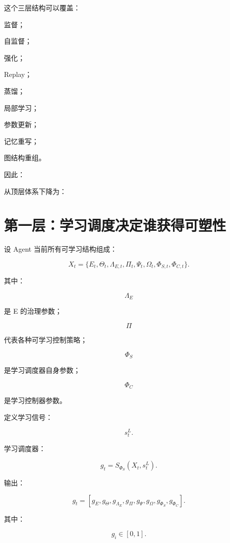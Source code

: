 这个三层结构可以覆盖：

监督；

自监督；

强化；

Replay；

蒸馏；

局部学习；

参数更新；

记忆重写；

图结构重组。

因此：

\begin{statementbox}
\centering
{}
\end{statementbox}

从顶层体系下降为：

\begin{statementbox}
\centering
{}
\end{statementbox}


\section{第一层：学习调度决定谁获得可塑性}

设 Agent 当前所有可学习结构组成：

\[
\boxed{
X_t
=
\{
E_t,
\Theta_t,
\Lambda_{E,t},
\Pi_t,
\Psi_t,
\Omega_t,
\Phi_{S,t},
\Phi_{C,t}
\}.
}
\]

其中：

\[
\Lambda_E
\]

是 E 的治理参数；

\[
\Pi
\]

代表各种可学习控制策略；

\[
\Phi_S
\]

是学习调度器自身参数；

\[
\Phi_C
\]

是学习控制器参数。

定义学习信号：

\[
s_t^L.
\]

学习调度器：

\[
\boxed{
g_t
=
S_{\Phi_S}
(
X_t,
s_t^L
).
}
\]

输出：

\[
g_t
=
[
g_E,
g_\Theta,
g_{\Lambda_E},
g_{\Pi},
g_\Psi,
g_\Omega,
g_{\Phi_S},
g_{\Phi_C}
].
\]

其中：

\[
g_i\in[0,1].
\]

